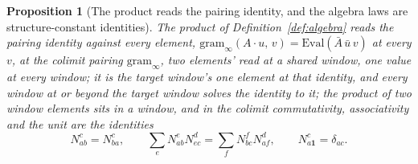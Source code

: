 \documentclass[11pt]{article}
\newtheorem{proposition}{Proposition}
\theoremstyle{definition}
\begin{document}
\begin{proposition}[The product reads the pairing identity, and the algebra laws
are structure-constant identities]\label{prop:algebra}
The product of Definition~\ref{def:algebra} reads the pairing
identity against every element,
$\mathrm{gram}_\infty(A\cdot u,\,v)=\mathrm{Eval}(\bar A\,\bar u\,v)$
at every $v$, at the colimit pairing $\mathrm{gram}_\infty$, two
elements' read at a shared window, one value at every window; it is
the target window's one element at that identity, and every window
at or beyond the target window solves the identity to it; the product of two window elements
sits in a window, and in the colimit commutativity, associativity and the unit
are the identities
\[
N^c_{ab}=N^c_{ba},\qquad
\sum_eN^e_{ab}N^d_{ec}=\sum_fN^f_{bc}N^d_{af},\qquad
N^c_{a\mathbf 1}=\delta_{ac} .
\]
\end{proposition}
\end{document}
